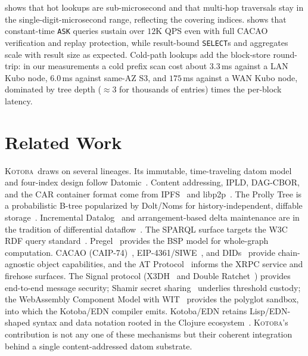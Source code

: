 \documentclass[11pt]{article}
\newcommand{\kotoba}{\textsc{Kotoba}}
\begin{document}
 shows that hot lookups are sub-microsecond and that multi-hop
traversals stay in the single-digit-microsecond range, reflecting the covering
indices.  shows that constant-time \texttt{ASK} queries sustain
over $12$K QPS even with full CACAO verification and replay protection, while
result-bound \texttt{SELECT}s and aggregates scale with result size as expected.
Cold-path lookups add the block-store round-trip: in our measurements a cold
prefix scan cost about $3.3$\,ms against a LAN Kubo node, $6.0$\,ms against
same-AZ S3, and $175$\,ms against a WAN Kubo node, dominated by tree depth
($\approx 3$ for thousands of entries) times the per-block latency.

\section{Related Work}
\label{sec:related}

\kotoba\ draws on several lineages. Its immutable, time-traveling datom model and
four-index design follow Datomic~\cite{datomic}. Content addressing, IPLD,
DAG-CBOR, and the CAR container format come from IPFS~\cite{ipfs,ipld} and
libp2p~\cite{libp2p}. The Prolly Tree is a probabilistic B-tree popularized by
Dolt/Noms for history-independent, diffable storage~\cite{prollytree}.
Incremental Datalog~\cite{datalog} and arrangement-based delta maintenance are in
the tradition of differential dataflow~\cite{differential-dataflow}. The SPARQL
surface targets the W3C RDF query standard~\cite{sparql}.
Pregel~\cite{pregel} provides the BSP model for whole-graph computation. CACAO
(CAIP-74)~\cite{cacao}, EIP-4361/SIWE~\cite{siwe}, and DIDs~\cite{did} provide
chain-agnostic object capabilities, and the AT Protocol~\cite{atproto} informs the
XRPC service and firehose surfaces. The Signal protocol (X3DH~\cite{signal-x3dh}
and Double Ratchet~\cite{signal-doubleratchet}) provides end-to-end message
security; Shamir secret sharing~\cite{shamir} underlies threshold custody; the
WebAssembly Component Model with WIT~\cite{wasm-component} provides the polyglot
sandbox, into which the Kotoba/EDN compiler emits. Kotoba/EDN retains
Lisp/EDN-shaped syntax and data notation rooted in the Clojure
ecosystem~\cite{clojure}. \kotoba's contribution is not any one of these
mechanisms but their coherent integration behind a single content-addressed
datom substrate.

\end{document}
